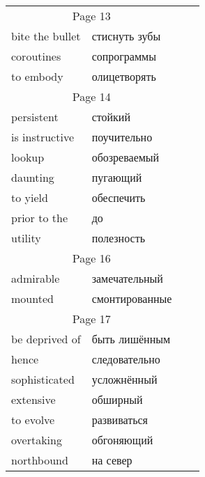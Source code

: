 \documentclass[12pt]{article}
\begin{document}
\begin{tabular}{| l l | l l | }
  \cline{1-2}\multicolumn{2}{|c|}{Page 13} && \\
  bite the bullet & стиснуть зубы          && \\
  coroutines      & сопрограммы            && \\
  to embody       & олицетворять           && \\

  \cline{1-2} \multicolumn{2}{|c|}{Page 14} && \\
  persistent     & стойкий                  && \\
  is instructive & поучительно              && \\
  lookup         & обозреваемый             && \\
  daunting       & пугающий                 && \\
  to yield       & обеспечить               && \\
  prior to the   & до                       && \\
  utility        & полезность               && \\

  \cline{1-2}\multicolumn{2}{|c|}{Page 16} && \\
  admirable & замечательный                && \\
  mounted   & смонтированные               && \\

  \cline{1-2} \multicolumn{2}{|c|}{Page 17} && \\
  be deprived of & быть лишённым            && \\
  hence          & следовательно            && \\
  sophisticated  & усложнённый              && \\
  extensive      & обширный                 && \\
  to evolve      & развиваться              && \\
  overtaking     & обгоняющий               && \\
  northbound     & на север                 && \\
  
  
  \hline

\end{tabular}
\end{document}
